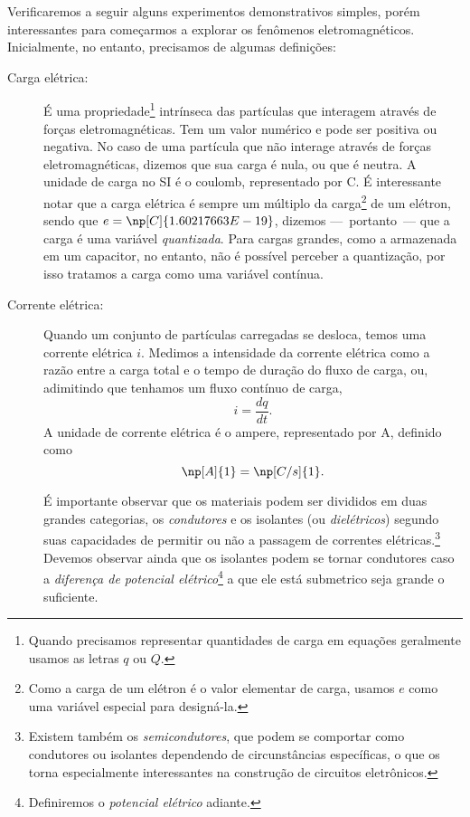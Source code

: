 Verificaremos a seguir alguns experimentos demonstrativos simples, porém interessantes para começarmos a explorar os fenômenos eletromagnéticos. Inicialmente, no entanto, precisamos de algumas definições:
\begin{description}
    \item[Carga elétrica:] É uma propriedade\footnote{Quando precisamos representar quantidades de carga em equações geralmente usamos as letras $q$ ou $Q$.} intrínseca das partículas que interagem através de forças eletromagnéticas. Tem um valor numérico e pode ser positiva ou negativa. No caso de uma partícula que não interage através de forças eletromagnéticas, dizemos que sua carga é nula, ou que é neutra. A unidade de carga no SI é o coulomb, representado por C. É interessante notar que a carga elétrica é sempre um múltiplo da carga\footnote{Como a carga de um elétron é o valor elementar de carga, usamos $e$ como uma variável especial para designá-la.} de um elétron, sendo que $e = \np[C]{1.60217663E-19}$, dizemos ---~portanto~--- que a carga é uma variável \emph{quantizada}. Para cargas grandes, como a armazenada em um capacitor, no entanto, não é possível perceber a quantização, por isso tratamos a carga como uma variável contínua.
    
    \item[Corrente elétrica:] Quando um conjunto de partículas carregadas se desloca, temos uma corrente elétrica $i$. Medimos a intensidade da corrente elétrica como a razão entre a carga total e o tempo de duração do fluxo de carga, ou, adimitindo que tenhamos um fluxo contínuo de carga,
    \begin{equation}
        i = \frac{dq}{dt}.
    \end{equation}
    A unidade de corrente elétrica é o ampere, representado por A, definido como
    \begin{equation}
        \np[A]{1} = \np[C/s]{1}.
    \end{equation}

    É importante observar que os materiais podem ser divididos em duas grandes categorias, os \emph{condutores} e os {isolantes} (ou \emph{dielétricos}) segundo suas capacidades de permitir ou não a passagem de correntes elétricas.\footnote{Existem também os \emph{semicondutores}, que podem se comportar como condutores ou isolantes dependendo de circunstâncias específicas, o que os torna especialmente interessantes na construção de circuitos eletrônicos.} Devemos observar ainda que os isolantes podem se tornar condutores caso a \emph{diferença de potencial elétrico}\footnote{Definiremos o \emph{potencial elétrico} adiante.} a que ele está submetrico seja grande o suficiente.
    

\end{description}
